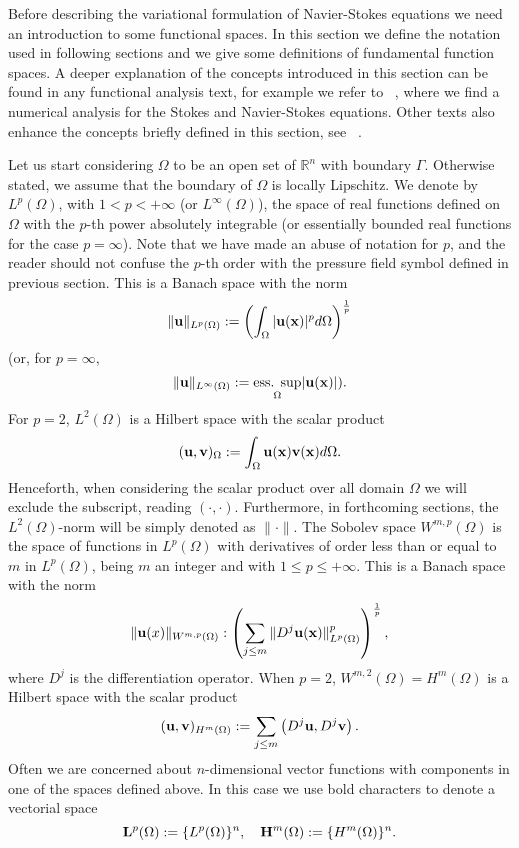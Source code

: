 Before describing the variational formulation of Navier-Stokes equations we need an introduction to some functional spaces. In this section we define the notation used in following sections and we give some definitions of fundamental function spaces. A deeper explanation of the concepts introduced in this section can be found in any functional analysis text, for example we refer to ~\cite{Temam_1984}, where we find a numerical analysis for the Stokes and Navier-Stokes equations. Other texts also enhance the concepts briefly defined in this section, see ~\cite{brenner_mathematical_2007}.

Let us start considering $\Omega$ to be an open set of $\mathbb{R}^n$ with boundary $\Gamma$. Otherwise stated, we assume that the boundary of $\Omega$ is locally Lipschitz. We denote by $L^p(\Omega)$, with $1<p<+\infty$ (or $L^\infty(\Omega)$), the space of real functions defined on $\Omega$ with the $p$-th power absolutely integrable (or essentially bounded real functions for the case $p=\infty$). Note that we have made an abuse of notation for $ p $, and the reader should not confuse the $ p $-th order with the pressure field symbol defined in previous section. This is a Banach space with the norm 
$$\|{\bf u}\|_{L^p(\Omega)}:=\left(\int_\Omega|{\bf u}({\bf x})|^pd\Omega\right)^{\frac{1}{p}}$$
(or, for $p=\infty$,
$$\|{\bf u}\|_{L^\infty(\Omega)}:=\underset{\Omega}{\mbox{ess. sup}}|{\bf u}({\bf x})|).$$
For $p=2$, $L^2(\Omega)$ is a Hilbert space with the scalar product
\begin{equation}
\label{eq-C2_scalar_product}
({\bf u},{\bf v})_\Omega:=\int_\Omega{\bf u}({\bf x}){\bf v}({\bf x})d\Omega.
\end{equation}
Henceforth, when considering the scalar product over all domain $\Omega$ we will exclude the subscript, reading $(\cdot,\cdot)$. Furthermore, in forthcoming sections, the $L^2(\Omega)$-norm will be simply denoted as $\|\cdot\|$.
The Sobolev space  $W^{m,p}(\Omega)$ is the space of functions in $L^p(\Omega)$ with derivatives of order less than or equal to $m$ in $L^p(\Omega)$, being $m$ an integer and with $1\leq p\leq+\infty$. This is a Banach space with the norm
$$\|{\bf u}(x)\|_{W^{m,p}(\Omega)}:\left(\sum_{j\leq m}\|D^j{\bf u}({\bf x})\|^p_{L^p(\Omega)}\right)^{\frac{1}{p}},$$
where $D^j$ is the differentiation operator. When $p=2$, $W^{m,2}(\Omega)=H^m(\Omega)$ is a Hilbert space with the scalar product
$$({\bf u},{\bf v})_{H^m(\Omega)}:=\sum_{j\leq m}\left(D^j{\bf u},D^j{\bf v}\right).$$
Often we are concerned about $n$-dimensional vector functions with components in one of the spaces defined above. In this case we use bold characters to denote a vectorial space
$${\bf L}^p(\Omega):=\{L^p(\Omega)\}^n,\quad{\bf H}^m(\Omega):=\{H^m(\Omega)\}^n.$$


